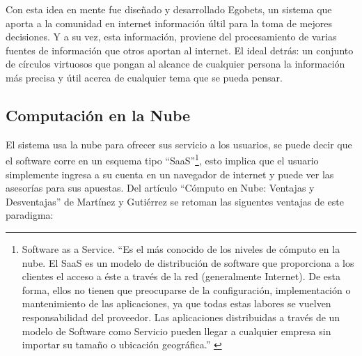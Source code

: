 Con esta idea en mente fue diseñado y desarrollado Egobets, un sistema que aporta a la comunidad en internet información últil para la toma de mejores decisiones. Y a su vez, esta información, proviene del procesamiento de varias fuentes de información que otros aportan al internet. El ideal detrás: un conjunto de círculos virtuosos que pongan al alcance de cualquier persona la información más precisa y útil acerca de cualquier tema que se pueda pensar.

\subsection{Computación en la Nube}

El sistema usa la nube para ofrecer sus servicio a los usuarios, se puede decir que el software corre en un esquema tipo ``SaaS''\footnote{Software as a Service. ``Es el más conocido de los niveles de cómputo en la nube. El SaaS es un modelo de distribución de software que proporciona a los clientes el acceso a éste a través de la red (generalmente Internet). De esta forma, ellos no tienen que preocuparse de la configuración, implementación o mantenimiento de las aplicaciones, ya que todas estas labores se vuelven responsabilidad del proveedor. Las aplicaciones distribuidas a través de un modelo de Software como Servicio pueden llegar a cualquier empresa sin importar su tamaño o ubicación geográfica.'' \cite{computoNube}}, esto implica que el usuario simplemente ingresa a su cuenta en un navegador de internet y puede ver las asesorías para sus apuestas.  
Del artículo ``Cómputo en Nube: Ventajas y Desventajas'' de Martínez y Gutiérrez \cite{computoNube}  se retoman las siguentes ventajas de este paradigma:
